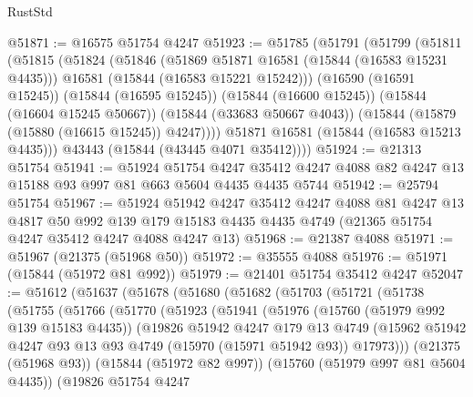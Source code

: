 \begin{lexlean}{RustStd}
\begin{coremodule}
@51871 := @16575 @51754 @4247
@51923 := @51785
    (@51791
      (@51799
        (@51811
          (@51815
            (@51824
              (@51846
                (@51869 @51871 @16581 (@15844 (@16583 @15231 @4435)))
                @16581
                (@15844 (@16583 @15221 @15242)))
              (@16590 (@16591 @15245))
              (@15844 (@16595 @15245))
              (@15844 (@16600 @15245))
              (@15844 (@16604 @15245 @50667))
              (@15844 (@33683 @50667 @4043))
              (@15844 (@15879 (@15880 (@16615 @15245)) @4247))))
          @51871
          @16581
          (@15844 (@16583 @15213 @4435)))
        @43443
        (@15844 (@43445 @4071 @35412))))
@51924 := @21313 @51754
@51941 := @51924
    @51754
    @4247
    @35412
    @4247
    @4088
    @82
    @4247
    @13
    @15188
    @93
    @997
    @81
    @663
    @5604
    @4435
    @4435
    @5744
@51942 := @25794 @51754
@51967 := @51924
    @51942
    @4247
    @35412
    @4247
    @4088
    @81
    @4247
    @13
    @4817
    @50
    @992
    @139
    @179
    @15183
    @4435
    @4435
    @4749
    (@21365 @51754 @4247 @35412 @4247 @4088 @4247 @13)
@51968 := @21387 @4088
@51971 := @51967 (@21375 (@51968 @50))
@51972 := @35555 @4088
@51976 := @51971 (@15844 (@51972 @81 @992))
@51979 := @21401 @51754 @35412 @4247
@52047 := @51612
    (@51637
      (@51678
        (@51680
          (@51682
            (@51703
              (@51721
                (@51738
                  (@51755
                    (@51766
                      (@51770
                        (@51923
                          (@51941
                            (@51976
                              (@15760 (@51979 @992 @139 @15183 @4435))
                              (@19826
                                @51942
                                @4247
                                @179
                                @13
                                @4749
                                (@15962
                                  @51942
                                  @4247
                                  @93
                                  @13
                                  @93
                                  @4749
                                  (@15970 (@15971 @51942 @93))
                                  @17973)))
                            (@21375 (@51968 @93))
                            (@15844 (@51972 @82 @997))
                            (@15760 (@51979 @997 @81 @5604 @4435))
                            (@19826
                              @51754
                              @4247

\end{coremodule}
\end{lexlean}
